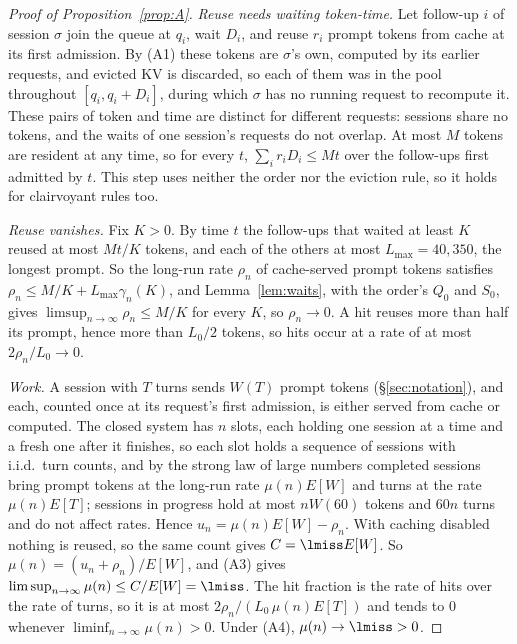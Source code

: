 \begin{proof}[Proof of Proposition~\ref{prop:A}]
\emph{Reuse needs waiting token-time.} Let follow-up $i$ of session $\sigma$ join the queue at $q_i$, wait $D_i$, and reuse $r_i$ prompt tokens from cache at its first admission. By (A1) these tokens are $\sigma$'s own, computed by its earlier requests, and evicted KV is discarded, so each of them was in the pool throughout $[q_i,q_i+D_i]$, during which $\sigma$ has no running request to recompute it. These pairs of token and time are distinct for different requests: sessions share no tokens, and the waits of one session's requests do not overlap. At most $M$ tokens are resident at any time, so for every $t$, $\sum_i r_iD_i\le Mt$ over the follow-ups first admitted by $t$. This step uses neither the order nor the eviction rule, so it holds for clairvoyant rules too.

\emph{Reuse vanishes.} Fix $K>0$. By time $t$ the follow-ups that waited at least $K$ reused at most $Mt/K$ tokens, and each of the others at most $L_{\max}=40{,}350$, the longest prompt. So the long-run rate $\rho_n$ of cache-served prompt tokens satisfies $\rho_n\le M/K+L_{\max}\gamma_n(K)$, and Lemma~\ref{lem:waits}, with the order's $Q_0$ and $S_0$, gives $\limsup_{n\to\infty}\rho_n\le M/K$ for every $K$, so $\rho_n\to0$. A hit reuses more than half its prompt, hence more than $L_0/2$ tokens, so hits occur at a rate of at most $2\rho_n/L_0\to0$.

\emph{Work.} A session with $T$ turns sends $W(T)$ prompt tokens (\S\ref{sec:notation}), and each, counted once at its request's first admission, is either served from cache or computed. The closed system has $n$ slots, each holding one session at a time and a fresh one after it finishes, so each slot holds a sequence of sessions with i.i.d.\ turn counts, and by the strong law of large numbers completed sessions bring prompt tokens at the long-run rate $\mu(n)E[W]$ and turns at the rate $\mu(n)E[T]$; sessions in progress hold at most $nW(60)$ tokens and $60n$ turns and do not affect rates. Hence $u_n=\mu(n)E[W]-\rho_n$. With caching disabled nothing is reused, so the same count gives $C=\lmiss E[W]$. So $\mu(n)=(u_n+\rho_n)/E[W]$, and (A3) gives $\limsup_{n\to\infty}\mu(n)\le C/E[W]=\lmiss$. The hit fraction is the rate of hits over the rate of turns, so it is at most $2\rho_n/(L_0\,\mu(n)E[T])$ and tends to 0 whenever $\liminf_{n\to\infty}\mu(n)>0$. Under (A4), $\mu(n)\to\lmiss>0$.
\end{proof}

